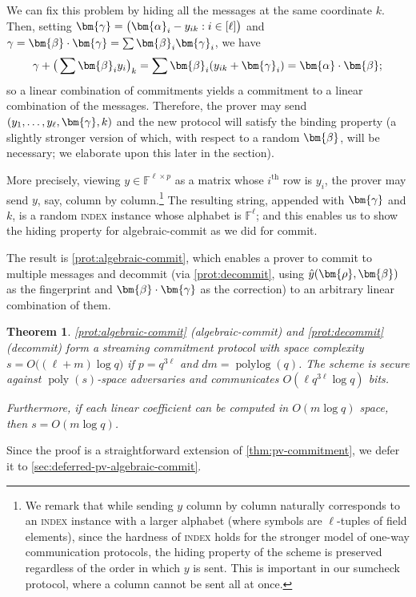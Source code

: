\documentclass[10pt,a4paper]{article}
\newtheorem{theorem}{Theorem}[section]
\theoremstyle{definition}
\newcommand{\field}{\mathbb{F}}
\newcommand{\poly}{\operatorname{poly}}
\newcommand{\polylog}{\operatorname{polylog}}
\newcommand{\indexproblem}{\normalfont\textsc{index}\xspace}
\newcommand{\pcommitlength}{p}
\newcommand{\pcommitstring}{y}
\newcommand{\dimension}{m}
\newcommand{\degree}{d}
\newcommand{\fieldsize}{q}
\newcommand{\evaluationpoint}{\bm{\fe2}}
\newcommand{\fingerprinttuple}{\bm{\rho}}
\def\fe#1{
    \ifnum#1=1
        \alpha
    \else
    \ifnum#1=2
        \beta
    \else
    \ifnum#1=3
        \gamma
    \fi\fi\fi
}
\begin{document}
We can fix this problem by hiding all the messages at the same coordinate $k$. Then, setting $\bm{\fe3} = \big(\bm{\fe1}_i - \pcommitstring_{ik} : i \in [\ell]\big)$ and $\fe3 = \bm{\fe2} \cdot \bm{\fe3} = \sum \bm{\fe2}_i \bm{\fe3}_i$, we have
\begin{equation*}
    \fe3 + \big(\sum \evaluationpoint_i \pcommitstring_i\big)_k = \sum \evaluationpoint_i (\pcommitstring_{ik} + \bm{\fe3}_i) = \bm{\fe1} \cdot \evaluationpoint;
\end{equation*}
so a linear combination of commitments yields a commitment to a linear combination of the messages. Therefore, the prover may send $(\pcommitstring_1, \ldots, \pcommitstring_\ell, \bm{\fe3}, k)$ and the new protocol will satisfy the binding property (a slightly stronger version of which, with respect to a random $\evaluationpoint$, will be necessary; we elaborate upon this later in the section).

More precisely, viewing $\pcommitstring \in \field^{\ell \times \pcommitlength}$ as a matrix whose $i^\text{th}$ row is $\pcommitstring_i$, the prover may send $\pcommitstring$, say, column by column.\footnote{We remark that while sending $\pcommitstring$ column by column naturally corresponds to an \indexproblem instance with a larger alphabet (where symbols are $\ell$-tuples of field elements), since the hardness of \indexproblem holds for the stronger model of one-way communication protocols, the hiding property of the scheme is preserved regardless of the order in which $\pcommitstring$ is sent. This is important in our sumcheck protocol, where a column cannot be sent all at once.} The resulting string, appended with $\bm{\fe3}$ and $k$, is a random \indexproblem instance whose alphabet is $\field^\ell$; and this enables us to show the hiding property for \textsf{algebraic-commit} as we did for \textsf{commit}.

The result is \cref{prot:algebraic-commit}, which enables a prover to commit to multiple messages and decommit (via \cref{prot:decommit}, using $\hat \pcommitstring(\fingerprinttuple, \bm{\fe2})$ as the fingerprint and $\bm{\fe2} \cdot \bm{\fe3}$ as the correction) to an arbitrary linear combination of them.

\begin{theorem}
    \label{thm:pv-algebraic-commitment}
    \cref{prot:algebraic-commit} (\textsf{algebraic-commit}) and \cref{prot:decommit} (\textsf{decommit}) form a streaming commitment protocol with space complexity $s = O\big((\ell + \dimension) \log \fieldsize\big)$ if $\pcommitlength = \fieldsize^{3\ell}$ and $\degree \dimension = \polylog(\fieldsize)$. The scheme is secure against $\poly(s)$-space adversaries and communicates $O(\ell \fieldsize^{3 \ell} \log \fieldsize)$ bits.
    
    Furthermore, if each linear coefficient can be computed in $O(\dimension \log \fieldsize)$ space, then $s = O(\dimension \log \fieldsize)$.
\end{theorem}
Since the proof is a straightforward extension of \cref{thm:pv-commitment}, we defer it to \cref{sec:deferred-pv-algebraic-commit}.
\end{document}
